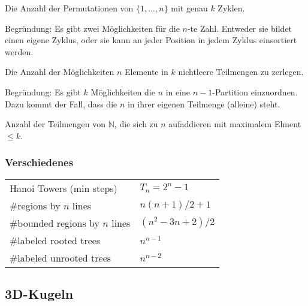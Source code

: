 \begin{bem}\label{bem:stirling1}
Die Anzahl der Permutationen von $\{1, \ldots, n\}$ mit genau $k$ Zyklen.

Begründung: Es gibt zwei Möglichkeiten für die $n$-te Zahl. Entweder sie bildet einen eigene Zyklus, oder sie kann an jeder Position in jedem Zyklus einsortiert werden.
\end{bem}

\begin{bem}\label{bem:stirling2}
Die Anzahl der Möglichkeiten $n$ Elemente in $k$ nichtleere Teilmengen zu zerlegen.

Begründung: Es gibt $k$ Möglichkeiten die $n$ in eine $n-1$-Partition einzuordnen. Dazu kommt der Fall, dass die $n$ in ihrer eigenen Teilmenge (alleine) steht.
\end{bem}

\begin{bem}\label{bem:integerPartitions}
Anzahl der Teilmengen von $\mathbb{N}$, die sich zu $n$ aufaddieren mit maximalem Elment $\leq k$.
\end{bem}

\subsubsection{Verschiedenes}
\begin{tabular}{|l|l|}
	\hline
	Hanoi Towers (min steps)		& $T_n = 2^n - 1$\\
	\#regions by $n$ lines			& $n\left(n + 1\right) / 2 + 1$\\
	\#bounded regions by $n$ lines		& $\left(n^2 - 3n + 2\right) / 2$\\
	\#labeled rooted trees			& $n^{n-1}$\\
	\#labeled unrooted trees		& $n^{n-2}$\\
	\hline
\end{tabular}

\subsection{3D-Kugeln}

